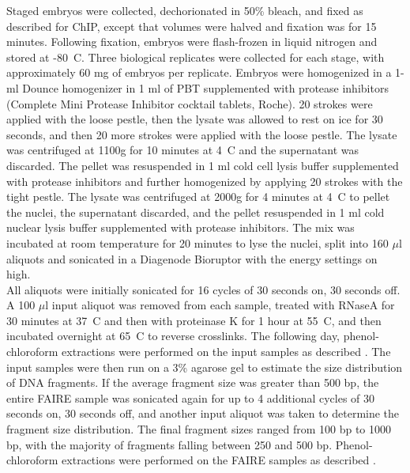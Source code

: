 Staged embryos were collected, dechorionated in 50\% bleach, and fixed as described for ChIP, except that volumes were halved and fixation was for 15 minutes. Following fixation, embryos were flash-frozen in liquid nitrogen and stored at -80\degree~C. Three biological replicates were collected for each stage, with approximately 60 mg of embryos per replicate. Embryos were homogenized in a 1-ml Dounce homogenizer in 1 ml of PBT supplemented with protease inhibitors (Complete Mini Protease Inhibitor cocktail tablets, Roche). 20 strokes were applied with the loose pestle, then the lysate was allowed to rest on ice for 30 seconds, and then 20 more strokes were applied with the loose pestle. The lysate was centrifuged at 1100g for 10 minutes at 4\degree~C and the supernatant was discarded. The pellet was resuspended in 1 ml cold cell lysis buffer supplemented with protease inhibitors and further homogenized by applying 20 strokes with the tight pestle. The lysate was centrifuged at 2000g for 4 minutes at 4\degree~C to pellet the nuclei, the supernatant discarded, and the pellet resuspended in 1 ml cold nuclear lysis buffer supplemented with protease inhibitors. The mix was incubated at room temperature for 20 minutes to lyse the nuclei, split into 160 \(\mu\)l aliquots and sonicated in a Diagenode Bioruptor with the energy settings on high.\\ 

All aliquots were initially sonicated for 16 cycles of 30 seconds on, 30 seconds off. A 100 \(\mu\)l input aliquot was removed from each sample, treated with RNaseA for 30 minutes at 37\degree~C and then with proteinase K for 1 hour at 55\degree~C, and then incubated overnight at 65\degree~C to reverse crosslinks. The following day, phenol-chloroform extractions were performed on the input samples as described \citep{simon_using_2012}. The input samples were then run on a 3\% agarose gel to estimate the size distribution of DNA fragments. If the average fragment size was greater than 500 bp, the entire FAIRE sample was sonicated again for up to 4 additional cycles of 30 seconds on, 30 seconds off, and another input aliquot was taken to determine the fragment size distribution. The final fragment sizes ranged from 100 bp to 1000 bp, with the majority of fragments falling between 250 and 500 bp. Phenol-chloroform extractions were performed on the FAIRE samples as described \citep{simon_using_2012}.

